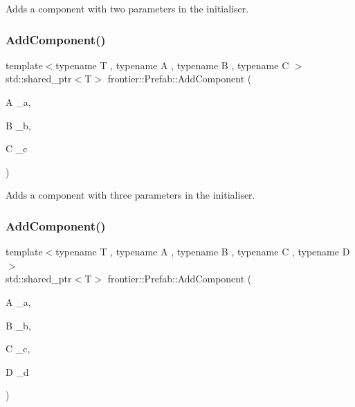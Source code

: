 Adds a component with two parameters in the initialiser. 

\mbox{\label{classfrontier_1_1_prefab_a6c7f7106b06aa35137eb9edc37221f68}} 
\subsubsection{\texorpdfstring{Add\+Component()}{AddComponent()}\hspace{0.1cm}{\footnotesize\ttfamily [4/5]}}
{\footnotesize\ttfamily template$<$typename T , typename A , typename B , typename C $>$ \\
std\+::shared\+\_\+ptr$<$T$>$ frontier\+::\+Prefab\+::\+Add\+Component (\begin{DoxyParamCaption}\item[{A}]{\+\_\+a,  }\item[{B}]{\+\_\+b,  }\item[{C}]{\+\_\+c }\end{DoxyParamCaption})\hspace{0.3cm}{\ttfamily [inline]}}



Adds a component with three parameters in the initialiser. 

\mbox{\label{classfrontier_1_1_prefab_abee1253ab0b10d162df0b7729916a441}} 
\subsubsection{\texorpdfstring{Add\+Component()}{AddComponent()}\hspace{0.1cm}{\footnotesize\ttfamily [5/5]}}
{\footnotesize\ttfamily template$<$typename T , typename A , typename B , typename C , typename D $>$ \\
std\+::shared\+\_\+ptr$<$T$>$ frontier\+::\+Prefab\+::\+Add\+Component (\begin{DoxyParamCaption}\item[{A}]{\+\_\+a,  }\item[{B}]{\+\_\+b,  }\item[{C}]{\+\_\+c,  }\item[{D}]{\+\_\+d }\end{DoxyParamCaption})\hspace{0.3cm}{\ttfamily [inline]}}



